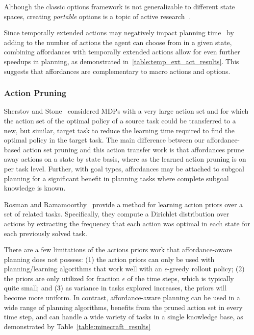 \documentclass[conference]{IEEEtran}
\newcommand{\enote}[1]{\textcolor{Red}{\textbf{}}}
\begin{document}
Although the classic options framework is not generalizable to different state spaces,
creating {\em portable} options is a topic of active research~\cite{konidaris07,konidaris2009efficient,Ravindran03analgebraic,croonenborghs2008learning,andre2002state,konidaris2012transfer}.

Since temporally extended actions may negatively impact planning time~\cite{Jong:2008zr} by adding to the number of actions the agent can choose from in a given state, combining affordances with temporally extended actions allow for even further speedups in planning, as demonstrated in~\ref{table:temp_ext_act_results}. This suggests that affordances are complementary to macro actions and options.

\subsubsection{Action Pruning}

Sherstov and Stone~\cite{sherstov2005improving} considered MDPs with a very large 
action set and for which the action set of the optimal policy of a source task could be 
transferred to a new, but similar, target task to reduce the learning time required to find
the optimal policy in the target task. The main difference between our affordance-based 
action set pruning and this action transfer work is that affordances prune away actions on 
a state by state basis, where as the learned action pruning is on per task level. Further, 
with goal types\enote{This is the first time we are now talking about LGD?}, affordances may be attached to subgoal planning for a significant
benefit in planning tasks where complete subgoal knowledge is known.

Rosman and Ramamoorthy~\cite{rosman2012good} provide a method for learning action
priors over a set of related tasks. Specifically, they compute a Dirichlet distribution over 
actions by extracting the frequency that each action was optimal in each state for each 
previously solved task.

There are a few limitations of the actions priors work that affordance-aware planning
does not possess: (1) the action priors can only be used with planning/learning algorithms
that work well with an $\epsilon$-greedy rollout policy; (2) the priors are only utilized for 
fraction $\epsilon$ of the time steps, which is typically quite small; and (3) as variance in
tasks explored increases, the priors will become more uniform. In contrast, affordance-aware
planning can be used in a wide range of planning algorithms, benefits from the pruned action
set in every time step, and can handle a wide variety of tasks in a single knowledge base,
as demonstrated by Table~\ref{table:minecraft_results}
\end{document}
